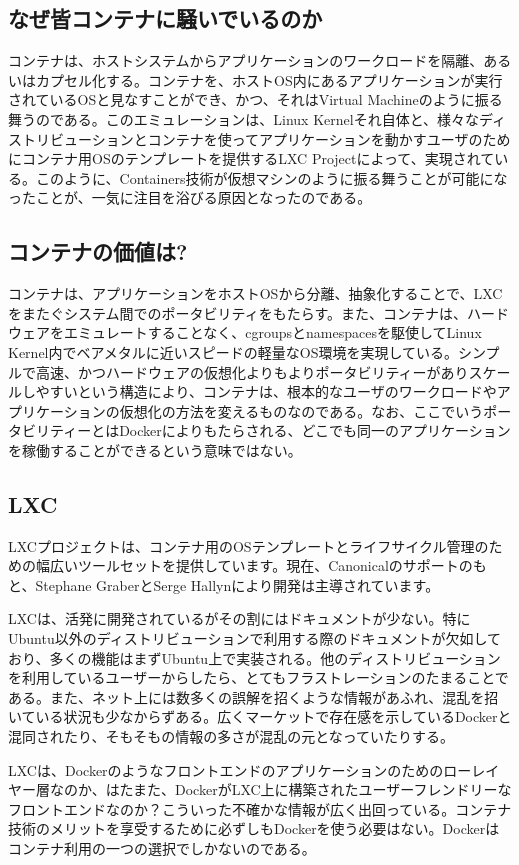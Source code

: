 \documentclass[9pt,b5paper,tombo]{jsbook}
\begin{document}
\subsection{なぜ皆コンテナに騒いでいるのか}
コンテナは、ホストシステムからアプリケーションのワークロードを隔離、あるいはカプセル化する。コンテナを、ホストOS内にあるアプリケーションが実行されているOSと見なすことができ、かつ、それはVirtual Machineのように振る舞うのである。このエミュレーションは、Linux Kernelそれ自体と、様々なディストリビューションとコンテナを使ってアプリケーションを動かすユーザのためにコンテナ用OSのテンプレートを提供するLXC Projectによって、実現されている。このように、Containers技術が仮想マシンのように振る舞うことが可能になったことが、一気に注目を浴びる原因となったのである。

\subsection{コンテナの価値は?}
コンテナは、アプリケーションをホストOSから分離、抽象化することで、LXCをまたぐシステム間でのポータビリティをもたらす。また、コンテナは、ハードウェアをエミュレートすることなく、cgroupsとnamespacesを駆使してLinux Kernel内でベアメタルに近いスピードの軽量なOS環境を実現している。シンプルで高速、かつハードウェアの仮想化よりもよりポータビリティーがありスケールしやすいという構造により、コンテナは、根本的なユーザのワークロードやアプリケーションの仮想化の方法を変えるものなのである。なお、ここでいうポータビリティーとはDockerによりもたらされる、どこでも同一のアプリケーションを稼働することができるという意味ではない。

\subsection{LXC}
LXCプロジェクトは、コンテナ用のOSテンプレートとライフサイクル管理のための幅広いツールセットを提供しています。現在、Canonicalのサポートのもと、Stephane GraberとSerge Hallynにより開発は主導されています。

LXCは、活発に開発されているがその割にはドキュメントが少ない。特にUbuntu以外のディストリビューションで利用する際のドキュメントが欠如しており、多くの機能はまずUbuntu上で実装される。他のディストリビューションを利用しているユーザーからしたら、とてもフラストレーションのたまることである。また、ネット上には数多くの誤解を招くような情報があふれ、混乱を招いている状況も少なからずある。広くマーケットで存在感を示しているDockerと混同されたり、そもそもの情報の多さが混乱の元となっていたりする。

LXCは、Dockerのようなフロントエンドのアプリケーションのためのローレイヤー層なのか、はたまた、DockerがLXC上に構築されたユーザーフレンドリーなフロントエンドなのか？こういった不確かな情報が広く出回っている。コンテナ技術のメリットを享受するために必ずしもDockerを使う必要はない。Dockerはコンテナ利用の一つの選択でしかないのである。
\end{document}
